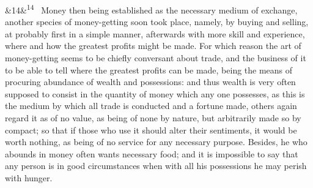 \documentclass[12pt]{article}
\newcommand{\para}[1][]{\par\noindent\ifx&#1&\else\textsuperscript{\footnotesize #1}~\fi}
\begin{document}
\para[14] Money then being established as the necessary medium of exchange, another species of money-getting soon took place, namely, by buying and selling, at probably first in a simple manner, afterwards with more skill and experience, where and how the greatest profits might be made. For which reason the art of money-getting seems to be chiefly conversant about trade, and the business of it to be able to tell where the greatest profits can be made, being the means of procuring abundance of wealth and possessions: and thus wealth is very often supposed to consist in the quantity of money which any one possesses, as this is the medium by which all trade is conducted and a fortune made, others again regard it as of no value, as being of none by nature, but arbitrarily made so by compact; so that if those who use it should alter their sentiments, it would be worth nothing, as being of no service for any necessary purpose. Besides, he who abounds in money often wants necessary food; and it is impossible to say that any person is in good circumstances when with all his possessions he may perish with hunger.
\end{document}
